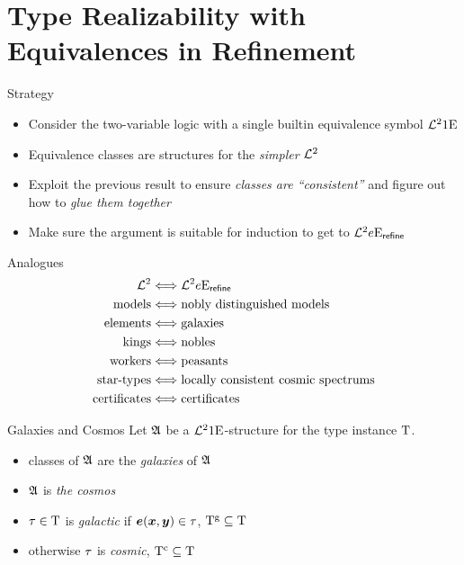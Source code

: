 \documentclass{beamer}
\begin{document}
\section{Type Realizability with Equivalences in Refinement}
\begin{frame}{Strategy}
\begin{itemize}
  \item Consider the two-variable logic with a single builtin equivalence symbol
  $\mathcal{L}^{2}{1}\mathrm{E}_{{}}$
  \item Equivalence classes are structures for the \emph{simpler} $\mathcal{L}^{2}$
  \item Exploit the previous result to ensure \emph{classes are ``consistent''} and
  figure out how to
  \emph{glue them together}
  \item Make sure the argument is suitable for induction to get to
  $\mathcal{L}^{2}{e}\mathrm{E}_{\mathsf{refine}}$
\end{itemize}
\end{frame}

\begin{frame}{Analogues}
\begin{align*}
  \mathcal{L}^{2} &\Longleftrightarrow \mathcal{L}^{2}{e}\mathrm{E}_{\mathsf{refine}} \\
  \text{models} &\Longleftrightarrow \text{nobly distinguished models} \\
  \text{elements} &\Longleftrightarrow \text{galaxies} \\
  \text{kings} &\Longleftrightarrow \text{nobles} \\
  \text{workers} &\Longleftrightarrow \text{peasants} \\
  \text{star-types} &\Longleftrightarrow \text{locally consistent cosmic
  spectrums} \\
  \text{certificates} &\Longleftrightarrow \text{certificates}
\end{align*}
\end{frame}

\begin{frame}{Galaxies and Cosmos}
Let $\mathfrak{A}$ be a $\mathcal{L}^{2}{1}\mathrm{E}_{{}}$-structure for the type instance $\mathrm{T}$.
\begin{itemize}
  \item classes of $\mathfrak{A}$ are the \emph{galaxies} of $\mathfrak{A}$
  \item $\mathfrak{A}$ is \emph{the cosmos}
  \item $\tau\in\mathrm{T}$ is \emph{galactic} if $\bm{e}(\bm{x},\bm{y})\in\tau$,
  $\mathrm{T}^{\mathrm{g}}\subseteq\mathrm{T}$
  \item otherwise $\tau$ is \emph{cosmic}, $\mathrm{T}^{\mathrm{c}}\subseteq\mathrm{T}$
\end{itemize}
\end{frame}
\end{document}
